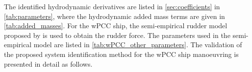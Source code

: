 \noindent The identified hydrodynamic derivatives are listed in \autoref{sec:coefficients} in \autoref{tab:parameters}, where the hydrodynamic added mass terms are given in \autoref{tab:added_masses}. For the wPCC ship, the semi-empirical rudder model proposed by \cite{alexanderssonSystemIdentificationPhysicsinformed2024b} is used to obtain the rudder force. The parameters used in the semi-empirical model are listed in \autoref{tab:wPCC_other_parameters}. The validation of the proposed system identification method for the wPCC ship manoeuvring is presented in detail as follows.
